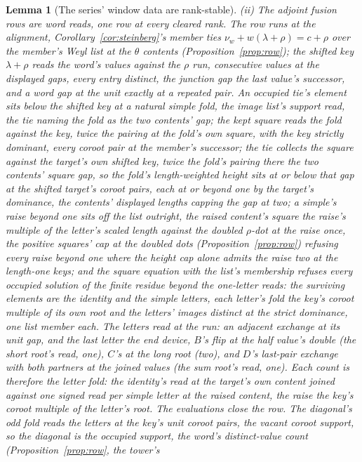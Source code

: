 \documentclass[11pt]{article}
\newtheorem{lemma}{Lemma}
\theoremstyle{definition}
\begin{document}
\begin{lemma}[The series' window data are rank-stable]
\emph{(ii) The adjoint fusion rows are word reads, one row at
every cleared rank.} The row runs at the alignment,
Corollary~\ref{cor:steinberg}'s member ties
$\nu_w+w(\lambda+\rho)=c+\rho$ over the member's Weyl list at
the $\theta$ contents (Proposition~\ref{prop:row}); the shifted
key $\lambda+\rho$ reads the word's values against the $\rho$
run, consecutive values at the displayed gaps, every entry
distinct, the junction gap the last value's successor, and a
word gap at the unit exactly at a repeated pair. An occupied
tie's element sits below the shifted key at a natural simple
fold, the image list's support read, the tie naming the fold as
the two contents' gap; the kept square reads the fold against the
key, twice the pairing at the fold's own square, with the key
strictly dominant, every coroot pair at the member's successor;
the tie collects the square against the target's own shifted key,
twice the fold's pairing there the two contents' square gap, so
the fold's length-weighted height sits at or below that gap at
the shifted target's coroot pairs, each at or beyond one by the
target's dominance, the contents' displayed lengths capping the
gap at two; a simple's raise beyond one sits off the list
outright, the raised content's square the raise's multiple of the
letter's scaled length against the doubled $\rho$-dot at the
raise once, the positive squares' cap at the doubled dots
(Proposition~\ref{prop:row}) refusing every raise beyond one
where the height cap alone admits the raise two at the length-one
keys; and the square equation with the list's membership refuses
every occupied solution of the finite residue beyond the
one-letter reads: the surviving elements are the identity and the
simple letters, each letter's fold the key's coroot multiple of
its own root and the letters' images distinct at the strict
dominance, one list member each. The letters read at the run: an
adjacent exchange at its unit gap, and the last letter the
\emph{end device}, $B$'s flip at the half value's double (the
short root's read, one), $C$'s at the long root (two), and $D$'s
last-pair exchange with both partners at the joined values (the
sum root's read, one). Each count is therefore the \emph{letter
fold}: the identity's read at the target's own content joined
against one signed read per simple letter at the raised content,
the raise the key's coroot multiple of the letter's root. The
evaluations close the row. The diagonal's odd fold reads the
letters at the key's unit coroot pairs, the vacant coroot
support, so the diagonal is the occupied support, the word's
distinct-value count (Proposition~\ref{prop:row}, the tower's

\end{lemma}
\end{document}
